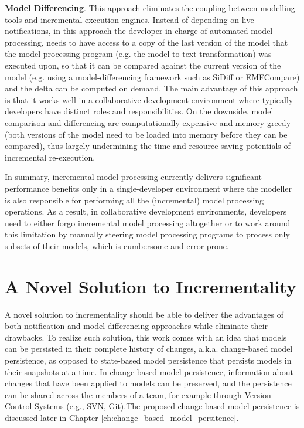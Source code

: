 \textbf{Model Differencing}. This approach eliminates the coupling between 
modelling tools and incremental execution engines. Instead of depending on 
live notifications, in this approach the developer in charge of automated model 
processing, needs to have access to a copy of the last version of the model that the model processing program (e.g. the model-to-text transformation) was 
executed upon, so that it can be compared against the current version of 
the model (e.g. using a model-differencing framework such as SiDiff or 
EMFCompare) and the delta can be computed on demand. The main advantage of 
this approach is that it works well in a collaborative development environment 
where typically developers have distinct roles and responsibilities. On the 
downside, model comparison and differencing are computationally expensive and 
memory-greedy (both versions of the model need to be loaded into memory before 
they can be compared), thus largely undermining the time and resource saving 
potentials of incremental re-execution. 

In summary, incremental model processing currently delivers significant 
performance benefits only in a single-developer environment where the modeller 
is also responsible for performing all the (incremental) model processing 
operations. As a result, in collaborative development environments, 
developers need to either forgo incremental model processing altogether 
or to work around this limitation by manually steering model processing 
programs to process only subsets of their models, which is cumbersome and 
error prone.

\section{A Novel Solution to Incrementality}
\label{sec:a_novel_solution_to_incrementality}
A novel solution to incrementality should be able to deliver the advantages of both notification and model differencing approaches while eliminate their drawbacks. To realize such solution, this work comes with an idea that models can be persisted in their complete history of changes, a.k.a. change-based model persistence, as opposed to state-based model persistence that persists models in their snapshots at a time. In change-based model persistence, information about changes that have been applied to models can be preserved, and the persistence can be shared across the members of a team, for example through Version Control Systems (e.g., SVN, Git).The proposed change-based model persistence is discussed later in Chapter \ref{ch:change_based_model_persitence}. 

